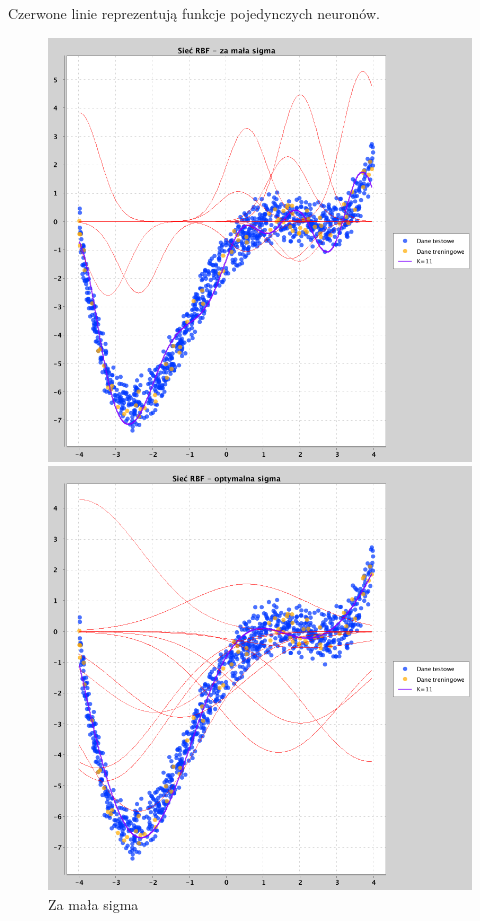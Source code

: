 \documentclass[a4paper, portrait,11pt]{article}
\begin{document}
Czerwone linie reprezentują funkcje pojedynczych neuronów.
\begin{figure}[!htb]
  \begin{minipage}{0.33\textwidth}
    \centering
    \includegraphics[width=1\linewidth]{../data/approximation3/2/small.png}
    \caption{\label{fig:2small}Za mała sigma}
  \end{minipage}
  \begin{minipage}{0.33\textwidth}
    \centering
    \includegraphics[width=1\linewidth]{../data/approximation3/2/optimal.png}

\end{minipage}
\end{figure}
\end{document}
